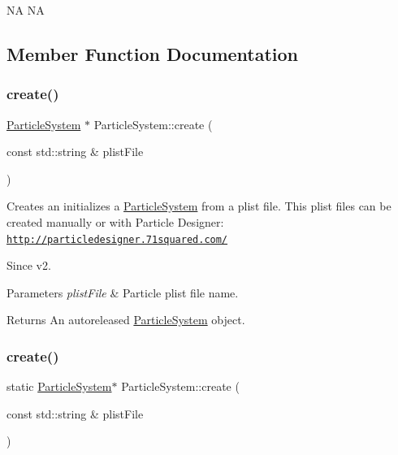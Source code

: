 NA  NA 

\subsection{Member Function Documentation}
\mbox{\label{classParticleSystem_a1def1ff715871730db5ed752bc17a2d5}} 
\subsubsection{\texorpdfstring{create()}{create()}\hspace{0.1cm}{\footnotesize\ttfamily [1/2]}}
{\footnotesize\ttfamily \hyperlink{classParticleSystem}{Particle\+System} $\ast$ Particle\+System\+::create (\begin{DoxyParamCaption}\item[{const std\+::string \&}]{plist\+File }\end{DoxyParamCaption})\hspace{0.3cm}{\ttfamily [static]}}

Creates an initializes a \hyperlink{classParticleSystem}{Particle\+System} from a plist file. This plist files can be created manually or with Particle Designer\+: \href{http://particledesigner.71squared.com/}{\tt http\+://particledesigner.\+71squared.\+com/} \begin{DoxySince}{Since}
v2.
\end{DoxySince}

\begin{DoxyParams}{Parameters}
{\em plist\+File} & Particle plist file name. \\
\hline
\end{DoxyParams}
\begin{DoxyReturn}{Returns}
An autoreleased \hyperlink{classParticleSystem}{Particle\+System} object. 
\end{DoxyReturn}
\mbox{\label{classParticleSystem_ad3fc419c2bbc1246d537a318291efc63}} 
\subsubsection{\texorpdfstring{create()}{create()}\hspace{0.1cm}{\footnotesize\ttfamily [2/2]}}
{\footnotesize\ttfamily static \hyperlink{classParticleSystem}{Particle\+System}$\ast$ Particle\+System\+::create (\begin{DoxyParamCaption}\item[{const std\+::string \&}]{plist\+File }\end{DoxyParamCaption})\hspace{0.3cm}{\ttfamily [static]}}

